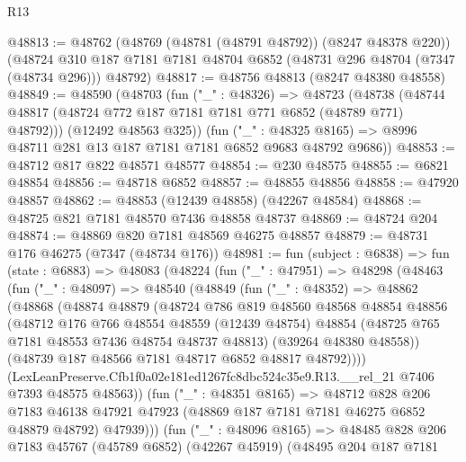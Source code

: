 \begin{lexlean}{R13}
\begin{coremodule}
@48813 := @48762
    (@48769 (@48781 (@48791 @48792)) (@8247 @48378 @220))
    (@48724 @310 @187 @7181 @7181 @48704 @6852 (@48731 @296 @48704 (@7347 (@48734 @296))) @48792)
@48817 := @48756 @48813 (@8247 @48380 @48558)
@48849 := @48590
    (@48703
      (fun ("_" : @48326) =>
      @48723
        (@48738 (@48744 @48817 (@48724 @772 @187 @7181 @7181 @771 @6852 (@48789 @771) @48792)))
        (@12492 @48563 @325))
      (fun ("_" : @48325 @8165) => @8996 @48711 @281 @13 @187 @7181 @7181 @6852 @9683 @48792 @9686))
@48853 := @48712 @817 @822 @48571 @48577
@48854 := @230 @48575
@48855 := @6821 @48854
@48856 := @48718 @6852
@48857 := @48855 @48856
@48858 := @47920 @48857
@48862 := @48853 (@12439 @48858) (@42267 @48584)
@48868 := @48725 @821 @7181 @48570 @7436 @48858 @48737
@48869 := @48724 @204
@48874 := @48869 @820 @7181 @48569 @46275 @48857
@48879 := @48731 @176 @46275 (@7347 (@48734 @176))
@48981 := fun (subject : @6838) =>
  fun (state : @6883) =>
  @48083
    (@48224
      (fun ("_" : @47951) =>
      @48298
        (@48463
          (fun ("_" : @48097) =>
          @48540
            (@48849
              (fun ("_" : @48352) =>
              @48862
                (@48868
                  (@48874
                    @48879
                    (@48724
                      @786
                      @819
                      @48560
                      @48568
                      @48854
                      @48856
                      (@48712
                        @176
                        @766
                        @48554
                        @48559
                        (@12439 @48754)
                        @48854
                        (@48725 @765 @7181 @48553 @7436 @48754 @48737 @48813)
                        (@39264 @48380 @48558))
                      (@48739 @187 @48566 @7181 @48717 @6852 @48817 @48792))))
                (LexLeanPreserve.Cfb1f0a02e181ed1267fc8dbc524c35e9.R13.__rel_21
                  @7406
                  @7393
                  @48575
                  @48563))
              (fun ("_" : @48351 @8165) =>
              @48712
                @828
                @206
                @7183
                @46138
                @47921
                @47923
                (@48869 @187 @7181 @7181 @46275 @6852 @48879 @48792)
                @47939)))
          (fun ("_" : @48096 @8165) =>
          @48485
            @828
            @206
            @7183
            @45767
            (@45789 @6852)
            (@42267 @45919)
            (@48495
              @204
              @187
              @7181

\end{coremodule}
\end{lexlean}
